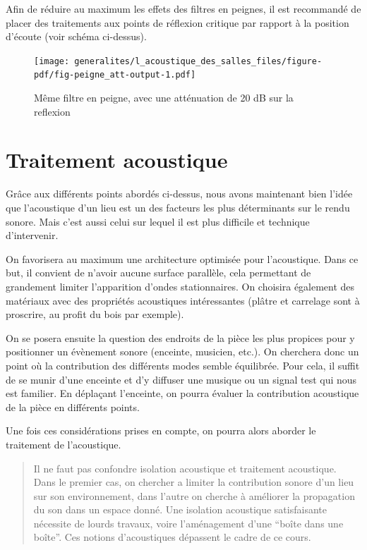 \documentclass[
  letterpaper,
  DIV=11,
  numbers=noendperiod]{scrreprt}
\begin{document}
Afin de réduire au maximum les effets des filtres en peignes, il est
recommandé de placer des traitements aux points de réflexion critique
par rapport à la position d'écoute (voir schéma ci-dessus).

\begin{figure}

{\centering \texttt{[image: generalites/l\_acoustique\_des\_salles\_files/figure-pdf/fig-peigne\_att-output-1.pdf]}

}

\caption{\label{fig-peigne_att}Même filtre en peigne, avec une
atténuation de 20 dB sur la reflexion}

\end{figure}

\hypertarget{traitement-acoustique}{%
\section{Traitement acoustique}\label{traitement-acoustique}}

Grâce aux différents points abordés ci-dessus, nous avons maintenant
bien l'idée que l'acoustique d'un lieu est un des facteurs les plus
déterminants sur le rendu sonore. Mais c'est aussi celui sur lequel il
est plus difficile et technique d'intervenir.

On favorisera au maximum une architecture optimisée pour l'acoustique.
Dans ce but, il convient de n'avoir aucune surface parallèle, cela
permettant de grandement limiter l'apparition d'ondes stationnaires. On
choisira également des matériaux avec des propriétés acoustiques
intéressantes (plâtre et carrelage sont à proscrire, au profit du bois
par exemple).

On se posera ensuite la question des endroits de la pièce les plus
propices pour y positionner un évènement sonore (enceinte, musicien,
etc.). On cherchera donc un point où la contribution des différents
modes semble équilibrée. Pour cela, il suffit de se munir d'une enceinte
et d'y diffuser une musique ou un signal test qui nous est familier. En
déplaçant l'enceinte, on pourra évaluer la contribution acoustique de la
pièce en différents points.

Une fois ces considérations prises en compte, on pourra alors aborder le
traitement de l'acoustique.

\begin{quote}
Il ne faut pas confondre isolation acoustique et traitement acoustique.
Dans le premier cas, on chercher a limiter la contribution sonore d'un
lieu sur son environnement, dans l'autre on cherche à améliorer la
propagation du son dans un espace donné. Une isolation acoustique
satisfaisante nécessite de lourds travaux, voire l'aménagement d'une
``boîte dans une boîte''. Ces notions d'acoustiques dépassent le cadre
de ce cours.
\end{quote}
\end{document}
